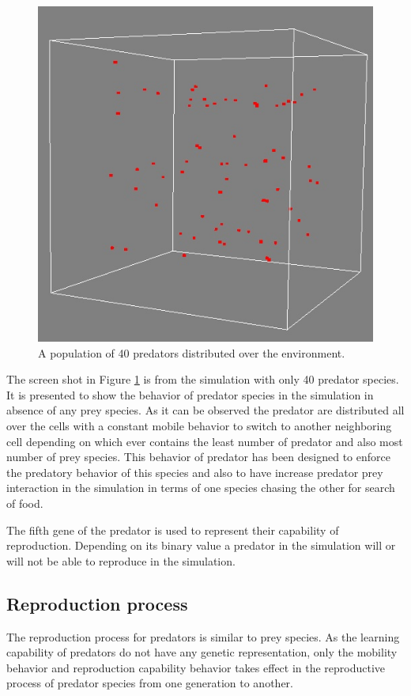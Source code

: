 \begin{figure}[H]
	\centering
	\includegraphics[scale=0.40]{images/predators-40}
	\caption{A population of 40 predators distributed over the environment.}
	\label{fig:predators-40}
\end{figure}

The screen shot in Figure \ref{fig:predators-40} is from the simulation with only 40 predator species. It is presented to show the behavior of predator species in the simulation in absence of any prey species. As it can be observed the predator are distributed all over the cells with a constant mobile behavior to switch to another neighboring cell depending on which ever contains the least number of predator and also most number of prey species. This behavior of predator has been designed to enforce the predatory behavior of this species and also to have increase predator prey interaction in the simulation in terms of one species chasing the other for search of food. 

The  fifth gene of the predator is used to represent their capability of reproduction.  Depending on its binary value a predator in the simulation will or will not be able to reproduce in the simulation. 

\subsection{Reproduction process}
The reproduction process for predators is similar to prey species. As the learning capability of predators do not have any genetic representation, only the mobility behavior and reproduction capability behavior takes effect in the reproductive process of predator species from one generation to another. 

